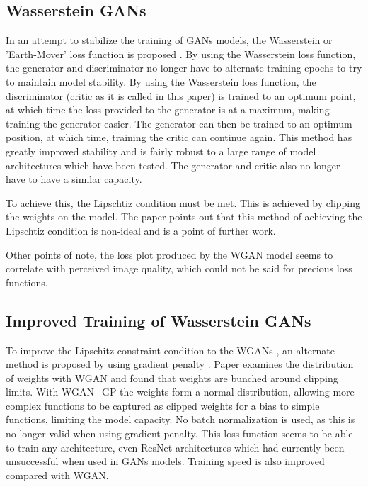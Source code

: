 \documentclass[12pt]{article}
\begin{document}
\subsection{Wasserstein GANs}
In an attempt to stabilize the training of GANs models, the Wasserstein or 'Earth-Mover' loss function is proposed \cite{Arjovsky2017}.
By using the Wasserstein loss function, the generator and discriminator no longer have to alternate training epochs to try to maintain model stability.
By using the Wasserstein loss function, the discriminator (critic as it is called in this paper) is trained to an optimum point, at which time the loss provided to the generator is at a maximum, making training the generator easier.
The generator can then be trained to an optimum position, at which time, training the critic can continue again.
This method has greatly improved stability and is fairly robust to a large range of model architectures which have been tested.
The generator and critic also no longer have to have a similar capacity.

To achieve this, the Lipschtiz condition must be met.
This is achieved by clipping the weights on the model.
The paper points out that this method of achieving the Lipschtiz condition is non-ideal and is a point of further work.

Other points of note, the loss plot produced by the WGAN model seems to correlate with perceived image quality, which could not be said for precious loss functions.

\subsection{Improved Training of Wasserstein GANs}
To improve the Lipschitz constraint condition to the WGANs \cite{Arjovsky2017}, an alternate method is proposed by using gradient penalty \cite{Gulrajani2017}.
Paper examines the distribution of weights with WGAN and found that weights are bunched around clipping limits.
With WGAN+GP the weights form a normal distribution, allowing more complex functions to be captured as clipped weights for a bias to simple functions, limiting the model capacity.
No batch normalization is used, as this is no longer valid when using gradient penalty.
This loss function seems to be able to train any architecture, even ResNet architectures which had currently been unsuccessful when used in GANs models.
Training speed is also improved compared with WGAN.
\end{document}
